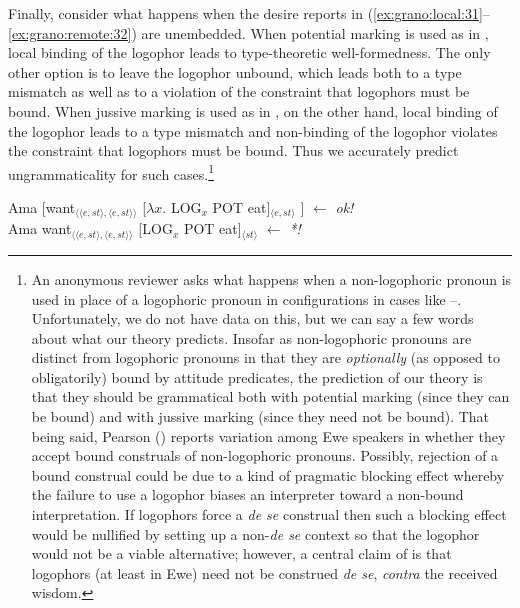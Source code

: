 \documentclass[output=paper,modfonts,nonflat]{langsci/langscibook}
\begin{document}
Finally, consider what happens when the desire reports in (\ref{ex:grano:local:31}--\ref{ex:grano:remote:32}) are unembedded. When potential marking is used as in , local binding of the logophor leads to type-theoretic well-formedness. The only other option is to leave the logophor unbound, which leads both to a type mismatch as well as to a violation of the constraint that logophors must be bound. When jussive marking is used as in , on the other hand, local binding of the logophor leads to a type mismatch and non-binding of the logophor violates the constraint that logophors must be bound. Thus we accurately predict ungrammaticality for such cases.\footnote{An anonymous reviewer asks what happens when a non-logophoric pronoun is used in place of a logophoric pronoun in configurations in cases like --. Unfortunately, we do not have data on this, but we can say a few words about what our theory predicts. Insofar as non-logophoric pronouns are distinct from logophoric pronouns in that they are \emph{optionally} (as opposed to obligatorily) bound by attitude predicates, the prediction of our theory is that they should be grammatical both with potential marking (since they can be bound) and with jussive marking (since they need not be bound). That being said, Pearson (\citeyear[97]{Pearson2015}) reports variation among Ewe speakers in whether they accept bound construals of non-logophoric pronouns. Possibly, rejection of a bound construal could be due to a kind of pragmatic blocking effect whereby the failure to use a logophor biases an interpreter toward a non-bound interpretation. If logophors force a \emph{de se} construal then such a blocking effect would be nullified by setting up a non-\emph{de se} context so that the logophor would not be a viable alternative; however, a central claim of \cite{Pearson2015} is that logophors (at least in Ewe) need not be construed \emph{de se}, \emph{contra} the received wisdom.}



\ea \label{ex:grano:local':33}
    \begin{xlist}
    \ex Ama [want$_{\langle\langle e,st\rangle,\langle e,st\rangle\rangle}$ [$\lambda x$. LOG$_{x}$ POT eat]$_{\langle e,st\rangle}$ ] \hfill $\leftarrow$ \emph{ok!}\\
    \ex Ama want$_{\langle\langle e,st\rangle,\langle e,st\rangle\rangle}$ [LOG$_{x}$ POT eat]$_{\langle st\rangle}$  \hfill $\leftarrow$ \emph{*!} 
    \end{xlist}
\z
\end{document}
